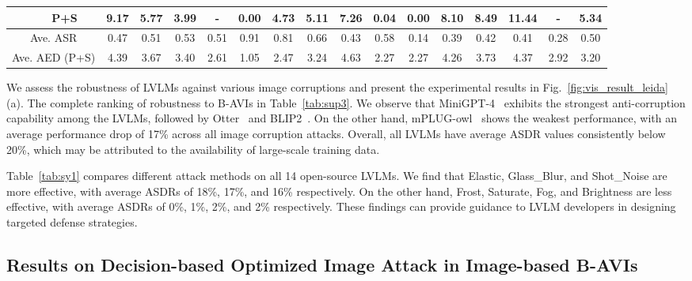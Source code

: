 \begin{table*}[t]
{\begin{tabular}{c|c|cccccccccccccc|c}
\multicolumn{1}{c|}{}                                              &  P+S  &9.17  & 5.77  & 3.99  & -     & 0.00 & 4.73  & 5.11  & 7.26   & 0.04  & 0.00     & 8.10  & 8.49  & 11.44 &-&5.34\\\hline
\multicolumn{2}{c|}{ {Ave. ASR}}                                                      & 0.47  & 0.51  & 0.53  & 0.51  & 0.91 & 0.81  & 0.66  & 0.43   & 0.58  & 0.14   & 0.39  & 0.42  & 0.41&0.28 &0.50 \\
\multicolumn{2}{c|}{ {Ave. AED (P+S)}}                                            &4.39  & 3.67  & 3.40  & 2.61  & 1.05 & 2.47  & 3.24  & 4.63   & 2.27  & 2.27  & 4.26  & 3.73  & 4.37&2.92 & 3.20\\ \hline
\end{tabular}
}
\end{table*}

We assess the robustness of LVLMs against various image corruptions and present the experimental results in Fig.~\ref{fig:vis_result_leida} (a). The complete ranking of robustness to B-AVIs in Table~\ref{tab:sup3}.
We observe that MiniGPT-4~\cite{zhu2023minigpt} exhibits the strongest anti-corruption capability among the LVLMs, followed by Otter~\cite{li2023otter} and BLIP2~\cite{li2023blip}. On the other hand, mPLUG-owl~\cite{ye2023mplug} shows the weakest performance, with an average performance drop of 17\% across all image corruption attacks. Overall, all LVLMs have average ASDR values consistently below 20\%, which may be attributed to the availability of large-scale training data.

Table~\ref{tab:sy1} compares different attack methods on all 14 open-source LVLMs. We find that Elastic, Glass\_Blur, and Shot\_Noise are more effective, with average ASDRs of 18\%, 17\%, and 16\% respectively. On the other hand, Frost, Saturate, Fog, and Brightness are less effective, with average ASDRs of 0\%, 1\%, 2\%, and 2\% respectively. These findings can provide guidance to LVLM developers in designing targeted defense strategies.

\subsection{Results on Decision-based Optimized Image Attack in Image-based B-AVIs}

